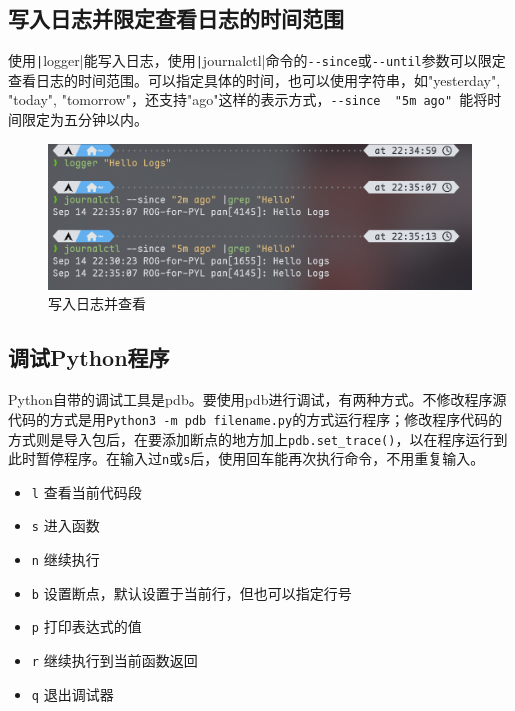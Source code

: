 \documentclass[fontset=ubuntu]{ctexart}
\begin{document}
\subsection{写入日志并限定查看日志的时间范围}
使用\texttt|logger|能写入日志，使用\texttt|journalctl|命令的\verb|--since|或\verb|--until|参数可以限定查看日志的时间范围。可以指定具体的时间，也可以使用字符串，如"yesterday", "today", "tomorrow"，还支持"ago"这样的表示方式，\verb|--since  "5m ago" |能将时间限定为五分钟以内。
\begin{figure}[htb]
    \centering
    \includegraphics[width=0.75\linewidth]{journalctl_2.png}
    \caption{写入日志并查看}
    \label{fig:journalctl_2}
\end{figure}

\subsection{调试Python程序}
Python自带的调试工具是pdb。要使用pdb进行调试，有两种方式。不修改程序源代码的方式是用\verb|Python3 -m pdb filename.py|的方式运行程序；修改程序代码的方式则是导入包后，在要添加断点的地方加上\verb|pdb.set_trace()|，以在程序运行到此时暂停程序。在输入过\verb|n|或\verb|s|后，使用回车能再次执行命令，不用重复输入。
\begin{itemize}
    \item \verb|l| 查看当前代码段
    \item \verb|s| 进入函数
    \item \verb|n| 继续执行
    \item \verb|b| 设置断点，默认设置于当前行，但也可以指定行号
    \item \verb|p| 打印表达式的值
    \item \verb|r| 继续执行到当前函数返回
    \item \verb|q| 退出调试器
\end{itemize}
\end{document}
